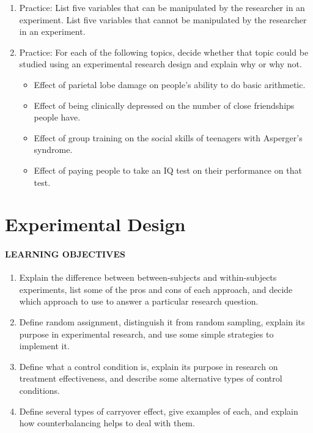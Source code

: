 \documentclass[
]{krantz}
\providecommand{\tightlist}{%
  \setlength{\itemsep}{0pt}\setlength{\parskip}{0pt}}
\begin{document}
\begin{enumerate}
\def\labelenumi{\arabic{enumi}.}
\tightlist
\item
  Practice: List five variables that can be manipulated by the researcher in an experiment. List five variables that cannot be manipulated by the researcher in an experiment.
\item
  Practice: For each of the following topics, decide whether that topic could be studied using an experimental research design and explain why or why not.

  \begin{itemize}
  \tightlist
  \item
    Effect of parietal lobe damage on people's ability to do basic arithmetic.
  \item
    Effect of being clinically depressed on the number of close friendships people have.
  \item
    Effect of group training on the social skills of teenagers with Asperger's syndrome.
  \item
    Effect of paying people to take an IQ test on their performance on that test.
  \end{itemize}
\end{enumerate}

\hypertarget{experimental-design}{%
\section{Experimental Design}\label{experimental-design}}

\hypertarget{learning-objectives-13}{%
\paragraph*{LEARNING OBJECTIVES}\label{learning-objectives-13}}

\begin{enumerate}
\def\labelenumi{\arabic{enumi}.}
\tightlist
\item
  Explain the difference between between-subjects and within-subjects experiments, list some of the pros and cons of each approach, and decide which approach to use to answer a particular research question.
\item
  Define random assignment, distinguish it from random sampling, explain its purpose in experimental research, and use some simple strategies to implement it.
\item
  Define what a control condition is, explain its purpose in research on treatment effectiveness, and describe some alternative types of control conditions.
\item
  Define several types of carryover effect, give examples of each, and explain how counterbalancing helps to deal with them.
\end{enumerate}
\end{document}
